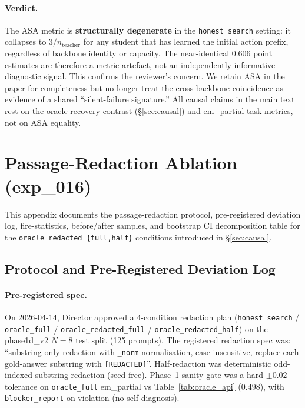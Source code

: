 \paragraph{Verdict.} The ASA metric is \textbf{structurally degenerate} in the \texttt{honest\_search} setting: it collapses to $3/n_\text{teacher}$ for any student that has learned the initial action prefix, regardless of backbone identity or capacity. The near-identical 0.606 point estimates are therefore a metric artefact, not an independently informative diagnostic signal. This confirms the reviewer's concern. We retain ASA in the paper for completeness but no longer treat the cross-backbone coincidence as evidence of a shared ``silent-failure signature.'' All causal claims in the main text rest on the oracle-recovery contrast (\S\ref{sec:causal}) and em\_partial task metrics, not on ASA equality.

\section{Passage-Redaction Ablation (exp\_016)}
\label{app:redaction}

This appendix documents the passage-redaction protocol, pre-registered deviation log, fire-statistics, before/after samples, and bootstrap CI decomposition table for the \texttt{oracle\_redacted\_\{full,half\}} conditions introduced in \S\ref{sec:causal}.

\subsection{Protocol and Pre-Registered Deviation Log}
\label{app:redaction_protocol}

\paragraph{Pre-registered spec.}
On 2026-04-14, Director approved a 4-condition redaction plan (\texttt{honest\_search} / \texttt{oracle\_full} / \texttt{oracle\_redacted\_full} / \texttt{oracle\_redacted\_half}) on the phase1d\_v2 $N{=}8$ test split (125 prompts). The registered redaction spec was: ``substring-only redaction with \texttt{\_norm} normalisation, case-insensitive, replace each gold-answer substring with \texttt{[REDACTED]}''. Half-redaction was deterministic odd-indexed substring redaction (seed-free). Phase~1 sanity gate was a hard $\pm 0.02$ tolerance on \texttt{oracle\_full} em\_partial vs Table~\ref{tab:oracle_api} ($0.498$), with \texttt{blocker\_report}-on-violation (no self-diagnosis).

